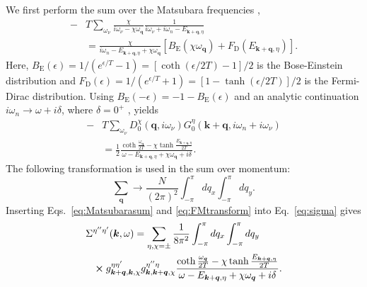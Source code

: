 \documentclass[aps, prb, twocolumn,amsmath,amssymb,floatfix]{revtex4-2}
\begin{document}
We first perform the sum over the Matsubara frequencies \cite{BruusFlensberg, mahanMatsubara},
\begin{align}
    -&T\sum_{\omega_\nu} \frac{\chi}{i\omega_\nu -\chi \omega_{\boldsymbol{q}}}\frac{1}{i\omega_\nu+i\omega_n-E_{\boldsymbol{k}+\boldsymbol{q}, \eta}}  \nonumber\\
    &=\frac{\chi}{i\omega_n - E_{\boldsymbol{k}+\boldsymbol{q}, \eta} +\chi \omega_{\boldsymbol{q}}} \left[ B_{\text{E}}(\chi \omega_{\boldsymbol{q}}) + F_{\text{D}}(E_{\boldsymbol{k}+\boldsymbol{q}, \eta})\right].
\end{align}
Here, $B_{\text{E}}(\epsilon) = 1/(e^{\epsilon/T}-1) = [\coth(\epsilon /2T)-1]/2$ is the Bose-Einstein distribution and $F_{\text{D}}(\epsilon) = 1/(e^{\epsilon/T}+1) = [1-\tanh(\epsilon /2T)]/2$ is the Fermi-Dirac distribution. 
Using $B_{\text{E}}(-\epsilon) = -1 - B_{\text{E}}(\epsilon)$ and an analytic continuation $i\omega_n \to \omega + i\delta$, where $\delta = 0^+$ \cite{mahanMatsubara, elphcselfenergyprlpark, elphcselfenergyprltse}, yields
\begin{align}
\label{eq:Matsubarasum}
        -&T\sum_{\omega_\nu}D_0^{\chi}(\boldsymbol{q},i\omega_\nu)G_0^\eta(\boldsymbol{k}+\boldsymbol{q}, i\omega_n+i\omega_\nu)  \nonumber \\
        &=\frac12 \frac{\coth\frac{\omega_{\boldsymbol{q}}}{2T}-\chi\tanh\frac{E_{\boldsymbol{k}+\boldsymbol{q},\eta}}{2T}}{\omega-E_{\boldsymbol{k}+\boldsymbol{q}, \eta}+\chi\omega_{\boldsymbol{q}}+i\delta}. 
\end{align}
The following transformation is used in the sum over momentum:
\begin{equation}
\label{eq:FMtransform}
    \sum_{\boldsymbol{q}} \to \frac{N}{(2\pi)^2}\int_{-\pi}^{\pi} dq_x \int_{-\pi}^{\pi} dq_y. 
\end{equation}
Inserting Eqs.~\eqref{eq:Matsubarasum} and \eqref{eq:FMtransform} into Eq.~\eqref{eq:sigma} gives 
\begin{align}
\label{eq:sigmaFM}
     \Sigma&^{\eta''\eta'}(\boldsymbol{k}, \omega) = \sum_{\eta, \chi = \pm} \frac{1}{8\pi^2}\int_{-\pi}^{\pi} dq_x \int_{-\pi}^{\pi} dq_y \nonumber \\
     &\cross g_{\boldsymbol{k}+\boldsymbol{q}, \boldsymbol{k}, \chi}^{\eta\eta'} g_{\boldsymbol{k}, \boldsymbol{k}+\boldsymbol{q}, \chi}^{\eta''\eta} \frac{\coth\frac{\omega_{\boldsymbol{q}}}{2T}-\chi\tanh\frac{E_{\boldsymbol{k}+\boldsymbol{q},\eta}}{2T}}{\omega-E_{\boldsymbol{k}+\boldsymbol{q}, \eta}+\chi\omega_{\boldsymbol{q}}+i\delta}.
\end{align}
\end{document}
